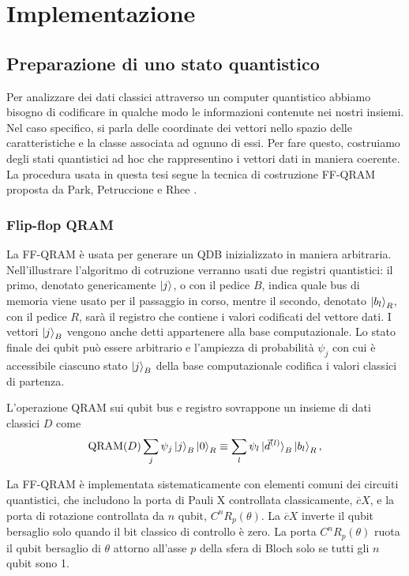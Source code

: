 \chapter{Implementazione}\label{ch:implementazione}

\section{Preparazione di uno stato quantistico}

Per analizzare dei dati classici attraverso un computer quantistico 
abbiamo bisogno di codificare in qualche modo le informazioni 
contenute nei nostri insiemi. Nel caso specifico, si parla delle 
coordinate dei vettori nello spazio delle caratteristiche e la 
classe associata ad ognuno di essi. 
Per fare questo, costruiamo degli stati quantistici 
ad hoc che rappresentino i vettori dati in maniera coerente. 
La procedura usata in questa tesi segue la tecnica di costruzione 
\ac{FF-QRAM} proposta da Park, Petruccione e Rhee \cite{petruccione}. 

\subsection{Flip-flop QRAM} \label{sec:ff-qram}

La \ac{FF-QRAM} è usata per generare un \ac{QDB} inizializzato in maniera arbitraria. 
Nell'illustrare l'algoritmo di cotruzione verranno usati due registri quantistici: 
il primo, denotato genericamente $\ket{j}$, o con il pedice $B$, indica quale bus 
di memoria viene usato per il passaggio in corso, mentre il secondo, denotato 
$\ket{b_l}_R$, con il pedice $R$, sarà il registro che contiene i 
valori codificati del vettore dati. 
I vettori $\ket{j}_B$ vengono anche detti appartenere alla base computazionale. 
Lo stato finale dei qubit può essere 
arbitrario e l'ampiezza di probabilità $\psi_j$ con cui è accessibile ciascuno stato 
$\ket{j}_B$ della base computazionale codifica i valori classici di partenza. 

L'operazione QRAM sui qubit bus e registro sovrappone un insieme di dati classici $D$ come 
\begin{equation} \label{eq:qram}
    \text{QRAM}(D) \sum_j \psi_j \ket{j}_B \ket{0}_R \equiv 
    \sum_l \psi_l \ket{\vec{d}^{(l)}}_B \ket{b_l}_R,
\end{equation}

La \ac{FF-QRAM} è implementata sistematicamente con elementi comuni dei circuiti 
quantistici, che includono la porta di Pauli X controllata classicamente, $\overline{c}X$, 
e la porta di rotazione controllata da $n$ qubit, $C^n R_p (\theta)$. 
La $\overline{c}X$ inverte il qubit bersaglio solo quando il bit classico di 
controllo è zero. La porta $C^n R_p (\theta)$ ruota il qubit bersaglio di $\theta$ attorno 
all'asse $p$ della sfera di Bloch solo se tutti gli $n$ qubit sono 1. 

